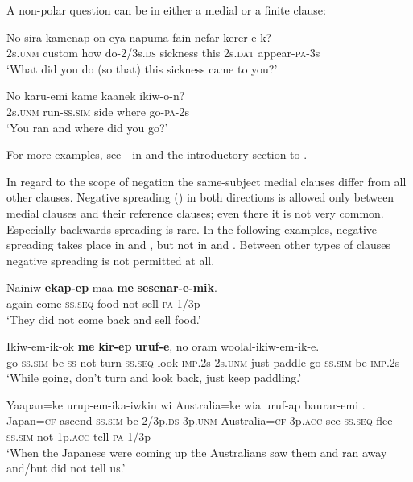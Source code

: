 A non-polar question can be in either a medial or a finite clause:

\ea%
\label{ex:8:x1451}
\gll No  sira  kamenap  on-eya  napuma  fain nefar  kerer-e-k?\\
2s.\textsc{unm} custom  how  do-2/3s.\textsc{ds} sickness  this 2s.\textsc{dat} appear-\textsc{pa}-3s\\
\glt`What did you do (so that) this sickness came to you?'
\z


\ea%
\label{ex:8:x1450}
\gll No  karu-emi  kame  kaanek  ikiw-o-n? \\
2s.\textsc{unm} run-\textsc{ss}.\textsc{sim} side  where  go-\textsc{pa}-2s\\
\glt`You ran and where did you go?'
\z


For more examples, see - in  and the introductory section to . 

In regard to the scope of negation the same-subject medial clauses differ from all other clauses.  Negative spreading () in both directions is allowed only between  medial clauses and their reference clauses; even there it is not very common. Especially backwards spreading is rare. In the following examples, negative spreading takes place in  and , but not in  and . Between other types of clauses negative spreading is not permitted at all. 

\ea%
\label{ex:8:x1443}
\gll Nainiw  \textbf{ekap-ep}  maa  \textbf{me} \textbf{sesenar-e-mik}. \\
again  come-\textsc{ss}.\textsc{seq} food  not  sell-\textsc{pa}-1/3p\\
\glt`They did not come back and sell food.'
\z


\ea%
\label{ex:8:x1447}
\gll Ikiw-em-ik-ok  \textbf{me} \textbf{kir-ep} \textbf{uruf-e}, no  oram  woolal-ikiw-em-ik-e.\\
go-\textsc{ss}.\textsc{sim}-be-\textsc{ss} not  turn-\textsc{ss}.\textsc{seq} look-\textsc{imp}.2s 2s.\textsc{unm} just  paddle-go-\textsc{ss}.\textsc{sim}-be-\textsc{imp}.2s\\
\glt`While going, don't turn and look back, just keep paddling.'
\z


\ea%
\label{ex:8:x1446}
\gll Yaapan=ke  urup-em-ika-iwkin  wi  Australia=ke wia  uruf-ap  baurar-emi     .\\
Japan=\textsc{cf} ascend-\textsc{ss}.\textsc{sim}-be-2/3p.\textsc{ds} 3p.\textsc{unm} Australia=\textsc{cf} 3p.\textsc{acc} see-\textsc{ss}.\textsc{seq} flee-\textsc{ss}.\textsc{sim} not 1p.\textsc{acc} tell-\textsc{pa}-1/3p\\
\glt`When the Japanese were coming up the Australians saw them and ran away and/but did not tell us.'
\z


